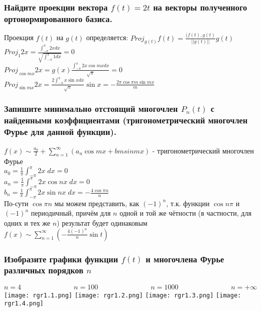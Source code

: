 \documentclass{article}
\begin{document}
    \subsubsection{Найдите проекции вектора $f(t) = 2t$ на векторы полученного ортонормированного базиса.}
    Проекция $f(t)$ на $g(t)$ определяется:
    $Proj_{g(t)} f(t) = \frac{(f(t), g(t)}{||g(t)||} g(t)$\\
    $Proj_{1} 2x = \frac{\int_{-\pi}^\pi 2x dx}{\sqrt{\int_{-\pi}^\pi 1 dx}} = 0$\\
    $Proj_{\cos mx} 2x = g(x) \frac{\int_{-\pi}^\pi 2x \cos mx dx}{\sqrt{\pi}} = 0$\\
    $Proj_{\sin mx} 2x = \frac{2 \int_{-\pi}^\pi x \sin x dx}{\sqrt{\pi}} \sin x = - \frac{2 \pi \cos \pi m \sin mx}{m}$\\
    
    
    \subsubsection{Запишите минимально отстоящий многочлен $P_n(t)$ с найденными коэффициентами (тригонометрический многочлен Фурье для данной функции).}
    $f(x) \sim \frac{a_0}{2} + \sum_{n=1}^{\infty}(a_u \cos mx + bm sin mx)$ - тригонометрический многочлен Фурье\\
    $a_0 = \frac{1}{\pi} \int_{-\pi}^\pi 2x \; dx = 0$\\
    $a_n = \frac{1}{\pi} \int_{-\pi}^\pi 2x \cos nx \; dx = 0$\\
    $b_n = \frac{1}{\pi} \int_{-\pi}^\pi 2x \sin nx \; dx = -\frac{4 \cos \pi n}{n}$\\
    По-сути $\cos \pi n$ мы можем представить, как $(-1)^n$, т.к. функции $\cos n \pi$ и $(-1)^n$ периодичный, причём для $n$ одной и той же чётности (в частности, для одних и тех же $n$) результат будет одинаковым\\
    $f(x) \sim \sum_{n=1}^{\infty}(- \frac{4(-1)^n}{n} \sin t)$
     
    \subsubsection{Изобразите графики функции $f(t)$ и многочлена Фурье различных порядков $n$}
    \begin{equation*}
        n = 4 \; \; \; \; \; \; \; \; \; \; \; \; \; \; \; \; \; \;
        \; \; \; \; \; \; \; \; \;
        n = 100 \; \; \; \; \; \; \; \; \; \; \; \; \; \; \; \; \; \;
        \; \; \; \; \; \; \; \; \;
        n = 1000 \; \; \; \; \; \; \; \; \; \; \; \; \; \; \; \; \; \;
        \; \; \; \; \; \; \; \; \;
        n = +\infty
    \end{equation*}
    \texttt{[image: rgr1.1.png]}
    \texttt{[image: rgr1.2.png]}
    \texttt{[image: rgr1.3.png]}
    \texttt{[image: rgr1.4.png]}
    
\end{document}
